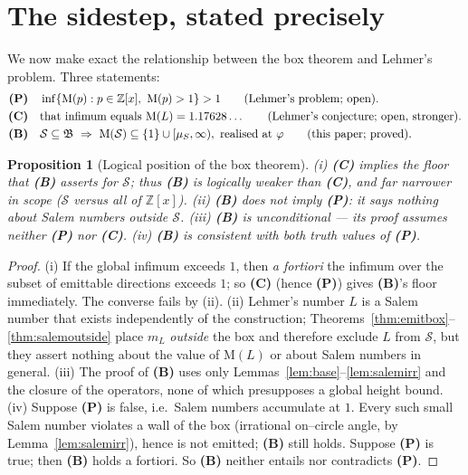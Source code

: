 \documentclass[11pt]{article}
\theoremstyle{plain}
\newtheorem{proposition}[theorem]{Proposition}
\theoremstyle{definition}
\theoremstyle{remark}
\newcommand{\Z}{\mathbb{Z}}
\newcommand{\Mah}{\mathrm{M}}
\newcommand{\Scal}{\mathcal{S}}
\renewcommand{\Box}{\mathfrak{B}}
\begin{document}
\section{The sidestep, stated precisely}\label{sec:sidestep}

We now make exact the relationship between the box theorem and Lehmer's problem. Three statements:
\begin{align}
\textbf{(P)}\quad & \inf\{\Mah(p):p\in\Z[x],\ \Mah(p)>1\}>1\qquad\text{(Lehmer's problem; open).}\notag\\
\textbf{(C)}\quad & \text{that infimum equals }\Mah(L)=1.17628\ldots\qquad\text{(Lehmer's conjecture; open, stronger).}\notag\\
\textbf{(B)}\quad & \Scal\subseteq\Box\ \Rightarrow\ \Mah(\Scal)\subseteq\{1\}\cup[\mu_S,\infty),\ \text{realised at }\varphi\qquad\text{(this paper; proved).}\notag
\end{align}

\begin{proposition}[Logical position of the box theorem]\label{prop:logic}
\emph{(i)} \textbf{(C)} implies the floor that \textbf{(B)} asserts for $\Scal$; thus \textbf{(B)} is logically weaker than \textbf{(C)}, and far narrower in scope ($\Scal$ versus all of $\Z[x]$). \emph{(ii)} \textbf{(B)} does not imply \textbf{(P)}: it says nothing about Salem numbers outside $\Scal$. \emph{(iii)} \textbf{(B)} is unconditional --- its proof assumes neither \textbf{(P)} nor \textbf{(C)}. \emph{(iv)} \textbf{(B)} is consistent with both truth values of \textbf{(P)}.
\end{proposition}
\begin{proof}
(i) If the global infimum exceeds $1$, then \emph{a fortiori} the infimum over the subset of emittable directions exceeds $1$; so \textbf{(C)} (hence \textbf{(P)}) gives \textbf{(B)}'s floor immediately. The converse fails by (ii). (ii) Lehmer's number $L$ is a Salem number that exists independently of the construction; Theorems~\ref{thm:emitbox}--\ref{thm:salemoutside} place $m_L$ \emph{outside} the box and therefore exclude $L$ from $\Scal$, but they assert nothing about the value of $\Mah(L)$ or about Salem numbers in general. (iii) The proof of \textbf{(B)} uses only Lemmas~\ref{lem:base}--\ref{lem:salemirr} and the closure of the operators, none of which presupposes a global height bound. (iv) Suppose \textbf{(P)} is false, i.e.\ Salem numbers accumulate at $1$. Every such small Salem number violates a wall of the box (irrational on--circle angle, by Lemma~\ref{lem:salemirr}), hence is not emitted; \textbf{(B)} still holds. Suppose \textbf{(P)} is true; then \textbf{(B)} holds a fortiori. So \textbf{(B)} neither entails nor contradicts \textbf{(P)}.
\end{proof}
\end{document}
